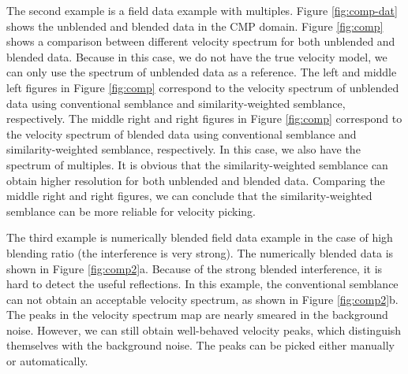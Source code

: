 The second example is a field data example with multiples. Figure \ref{fig:comp-dat} shows the unblended and blended data in the CMP domain. Figure \ref{fig:comp} shows a comparison between different velocity spectrum for both unblended and blended data. Because in this case, we do not have the true velocity model, we can only use the spectrum of unblended data as a reference. The left and middle left figures in Figure \ref{fig:comp} correspond to the velocity spectrum of unblended data using conventional semblance and similarity-weighted semblance, respectively. The middle right and right figures in Figure \ref{fig:comp} correspond to the velocity spectrum of blended data using conventional semblance and similarity-weighted semblance, respectively. In this case, we also have the spectrum of multiples. It is obvious that the similarity-weighted semblance can obtain higher resolution for both unblended and blended data. Comparing the middle right and right figures, we can conclude that the similarity-weighted semblance can be more reliable for velocity picking.

The third example is  numerically blended field data example in the case of high blending ratio (the interference is very strong). The numerically blended data is shown in Figure \ref{fig:comp2}a. Because of the strong blended interference, it is hard to detect the useful reflections. In this example, the conventional semblance can not obtain an acceptable velocity spectrum, as shown in Figure \ref{fig:comp2}b. The peaks in the velocity spectrum map are nearly smeared in the background
noise. However,  we can still obtain well-behaved velocity peaks,  which distinguish themselves with the background noise. The peaks can be picked either manually or automatically. 

